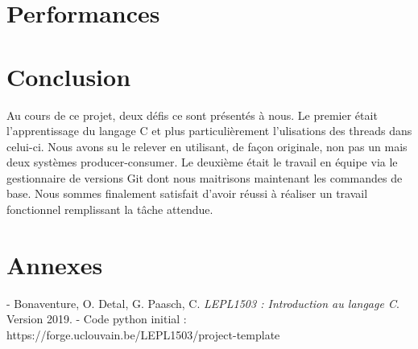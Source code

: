 \documentclass{article}
\begin{document}
\section{Performances}
\section{Conclusion}
Au cours de ce projet, deux défis ce sont présentés à nous. Le premier était l'apprentissage du langage C et plus particulièrement l'ulisations des threads dans celui-ci. Nous avons su le relever en utilisant, de façon originale, non pas un mais deux systèmes producer-consumer. Le deuxième était le travail en équipe via le gestionnaire de versions Git dont nous maitrisons maintenant les commandes de base. Nous sommes finalement satisfait d'avoir réussi à réaliser un travail fonctionnel remplissant la tâche attendue.
\section{Annexes}


- Bonaventure, O. Detal, G. Paasch, C. \textit{LEPL1503 : Introduction au langage C}. Version 2019.
- Code python initial :  https://forge.uclouvain.be/LEPL1503/project-template
\end{document}
